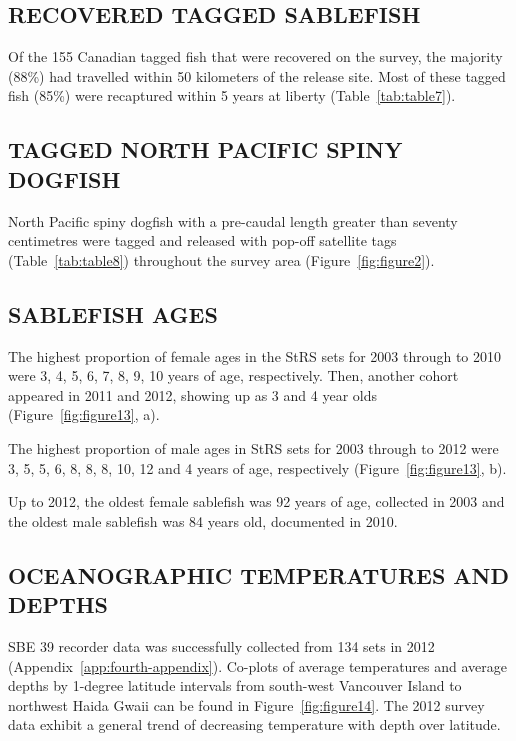 \documentclass[12pt]{article}\usepackage[]{graphicx}\usepackage[]{color}
\begin{document}
\hypertarget{recovered-tagged-sablefish}{%
\subsection{RECOVERED TAGGED SABLEFISH}\label{recovered-tagged-sablefish}}

Of the 155 Canadian tagged fish that were recovered on the survey, the majority (88\%) had travelled within 50 kilometers of the release site. Most of these tagged fish (85\%) were recaptured within 5 years at liberty (Table~\ref{tab:table7}).

\hypertarget{tagged-north-pacific-spiny-dogfish}{%
\subsection{TAGGED NORTH PACIFIC SPINY DOGFISH}\label{tagged-north-pacific-spiny-dogfish}}

North Pacific spiny dogfish with a pre-caudal length greater than seventy centimetres were tagged and released with pop-off satellite tags (Table~\ref{tab:table8}) throughout the survey area (Figure~\ref{fig:figure2}).

\hypertarget{sablefish-ages}{%
\subsection{SABLEFISH AGES}\label{sablefish-ages}}

The highest proportion of female ages in the StRS sets for 2003 through to 2010 were 3, 4, 5, 6, 7, 8, 9, 10 years of age, respectively. Then, another cohort appeared in 2011 and 2012, showing up as 3 and 4 year olds (Figure~\ref{fig:figure13}, a).

The highest proportion of male ages in StRS sets for 2003 through to 2012 were 3, 5, 5, 6, 8, 8, 8, 10, 12 and 4 years of age, respectively (Figure~\ref{fig:figure13}, b).

Up to 2012, the oldest female sablefish was 92 years of age, collected in 2003 and the oldest male sablefish was 84 years old, documented in 2010.

\hypertarget{oceanographic-temperatures-and-depths}{%
\subsection{OCEANOGRAPHIC TEMPERATURES AND DEPTHS}\label{oceanographic-temperatures-and-depths}}

SBE 39 recorder data was successfully collected from 134 sets in 2012 (Appendix~\ref{app:fourth-appendix}). Co-plots of average temperatures and average depths by 1-degree latitude intervals from south-west Vancouver Island to northwest Haida Gwaii can be found in Figure~\ref{fig:figure14}. The 2012 survey data exhibit a general trend of decreasing temperature with depth over latitude.
\end{document}

